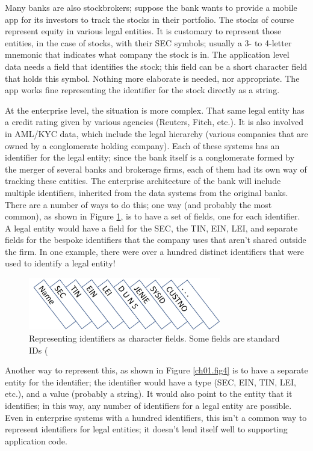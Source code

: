 Many banks are also stockbrokers; suppose the bank wants to provide a mobile app for its investors to track the stocks in their portfolio.  The stocks of course represent equity in various legal entities.  It is customary to represent those entities, in the case of stocks, with their SEC symbols; usually a 3- to 4-letter mnemonic that indicates what company the stock is in.  The application level data needs a field that identifies the stock; this field can be a short character field that holds this symbol.  Nothing more elaborate is needed, nor appropriate.  The app works fine representing the identifier for the stock directly as a string. 

At the enterprise level, the situation is more complex.  That same legal entity has a credit rating given by various agencies (Reuters, Fitch, etc.).  It is also involved in AML/KYC data, which include the legal hierarchy (various companies that are owned by a conglomerate holding company).  Each of these systems has an identifier for the legal entity; since the bank itself is a conglomerate formed by the merger of several banks and brokerage firms, each of them had its own way of tracking these entities.  The enterprise architecture of the bank will include multiple identifiers, inherited from the data systems from the original banks.  There are a number of ways to do this; one way (and probably the most common), as shown in Figure \ref{ch01.fig3}, is to have a set of fields, one  for each identifier.  A legal entity would have a field for the SEC, the TIN, EIN, LEI, and separate fields for the bespoke identifiers that the company uses that aren't shared outside the firm.  In one example, there were over a hundred distinct identifiers that were used to identify a legal entity!  

\begin{figure}[hbt] %
\centering
  \includegraphics[width=3.3in]{figures/id-table.jpg}
\caption{Representing identifiers as character fields.  Some fields are standard IDs ( }
\label{ch01.fig3} 
\end{figure}

Another way to represent this, as shown in Figure \ref{ch01.fig4} is to have a separate entity for the identifier;  the identifier would have a type (SEC, EIN, TIN, LEI, etc.), and a value (probably a string).  It would also point to the entity that it identifies; in this way, any number of identifiers for a legal entity are possible.  Even in enterprise systems with a hundred identifiers, this isn't a common way to represent identifiers for legal entities; it doesn't lend itself well to supporting application code.  

